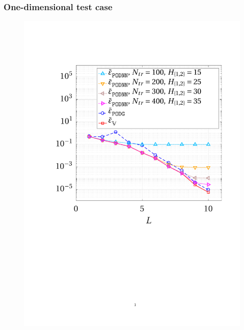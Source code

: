 \documentclass{elsarticle}
\numberwithin{equation}{section}
\theoremstyle{theorem}
\theoremstyle{definition}
\theoremstyle{remark}
\theoremstyle{proposition}
\numberwithin{figure}{section}
\begin{document}
		
		
		
	\subsubsection{One-dimensional test case}
	\label{section:One-dimensional test case}
	
		\begin{figure}[t!]
			\center
			\includegraphics[scale = 0.385, trim = {1cm 9.5cm 1cm 3.5cm}, clip]{poisson1d_3_error_vs_rank}

\end{figure}
\end{document}
